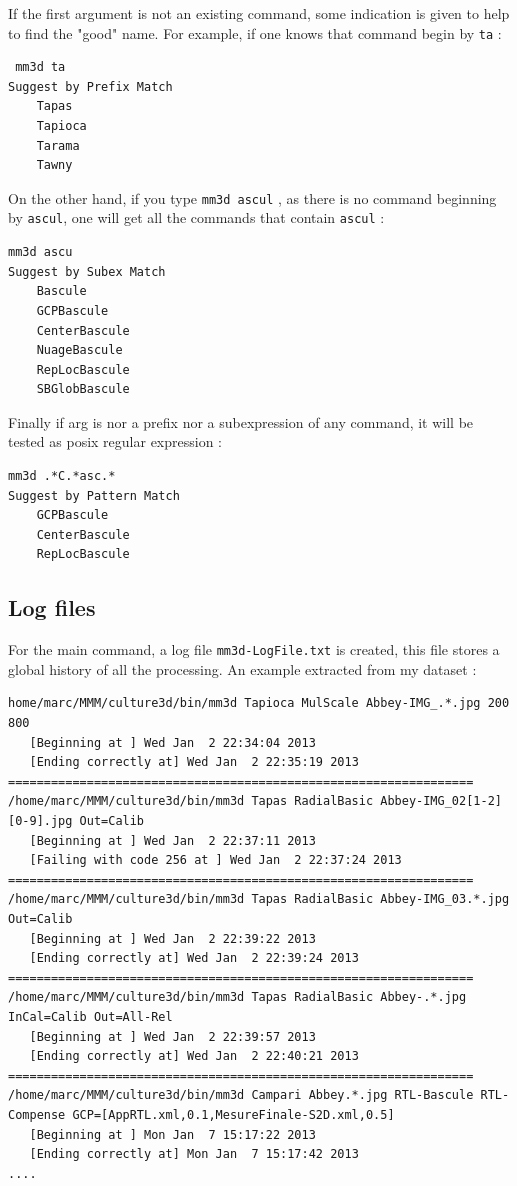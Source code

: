 If the first argument is not an existing command, some indication is given to help to find
the "good" name. For example, if one knows that command begin by {\tt ta}  :

\begin{verbatim}
 mm3d ta
Suggest by Prefix Match
    Tapas
    Tapioca
    Tarama
    Tawny
\end{verbatim}

On the other hand, if you type {\tt mm3d ascul} , as there is no command beginning by {\tt ascul},
one will get all the commands that contain {\tt ascul} :


\begin{verbatim}
mm3d ascu
Suggest by Subex Match
    Bascule
    GCPBascule
    CenterBascule
    NuageBascule
    RepLocBascule
    SBGlobBascule
\end{verbatim}


Finally if arg is nor a prefix nor a subexpression of any command, it will be tested as posix regular
expression :

\begin{verbatim}
mm3d .*C.*asc.*
Suggest by Pattern Match
    GCPBascule
    CenterBascule
    RepLocBascule
\end{verbatim}

\subsection{Log files}

For the main command, a log file {\tt mm3d-LogFile.txt} is created, this file stores
a global history of all the processing. An example extracted from my dataset :

\begin{verbatim}
home/marc/MMM/culture3d/bin/mm3d Tapioca MulScale Abbey-IMG_.*.jpg 200 800
   [Beginning at ] Wed Jan  2 22:34:04 2013
   [Ending correctly at] Wed Jan  2 22:35:19 2013
=================================================================
/home/marc/MMM/culture3d/bin/mm3d Tapas RadialBasic Abbey-IMG_02[1-2][0-9].jpg Out=Calib
   [Beginning at ] Wed Jan  2 22:37:11 2013
   [Failing with code 256 at ] Wed Jan  2 22:37:24 2013
=================================================================
/home/marc/MMM/culture3d/bin/mm3d Tapas RadialBasic Abbey-IMG_03.*.jpg Out=Calib
   [Beginning at ] Wed Jan  2 22:39:22 2013
   [Ending correctly at] Wed Jan  2 22:39:24 2013
=================================================================
/home/marc/MMM/culture3d/bin/mm3d Tapas RadialBasic Abbey-.*.jpg InCal=Calib Out=All-Rel
   [Beginning at ] Wed Jan  2 22:39:57 2013
   [Ending correctly at] Wed Jan  2 22:40:21 2013
=================================================================
/home/marc/MMM/culture3d/bin/mm3d Campari Abbey.*.jpg RTL-Bascule RTL-Compense GCP=[AppRTL.xml,0.1,MesureFinale-S2D.xml,0.5]
   [Beginning at ] Mon Jan  7 15:17:22 2013
   [Ending correctly at] Mon Jan  7 15:17:42 2013
....
\end{verbatim}

